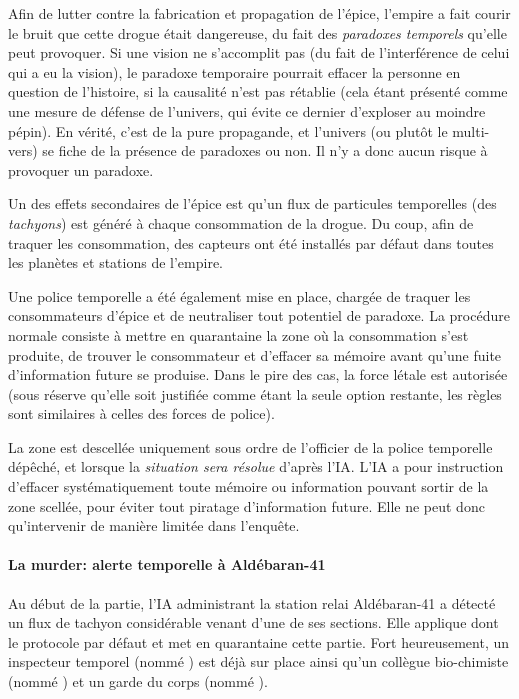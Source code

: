 {	\par Afin de lutter contre la fabrication et propagation de l'épice, l'empire a fait courir le bruit que cette drogue était dangereuse, du fait des \emph{paradoxes temporels} qu'elle peut provoquer. Si une vision ne s'accomplit pas (du fait de l'interférence de celui qui a eu la vision), le paradoxe temporaire pourrait effacer la personne en question de l'histoire, si la causalité n'est pas rétablie (cela étant présenté comme une mesure de défense de l'univers, qui évite ce dernier d'exploser au moindre pépin). En vérité, c'est de la pure propagande, et l'univers (ou plutôt le multi-vers) se fiche de la présence de paradoxes ou non. Il n'y a donc aucun risque à provoquer un paradoxe.
	
	\par Un des effets secondaires de l'épice est qu'un flux de particules temporelles (des \emph{tachyons}) est généré à chaque consommation de la drogue. Du coup, afin de traquer les consommation, des capteurs ont été installés par défaut dans toutes les planètes et stations de l'empire.
	
	\par Une police temporelle a été également mise en place, chargée de traquer les consommateurs d'épice et de neutraliser tout potentiel de paradoxe. La procédure normale consiste à mettre en quarantaine la zone où la consommation s'est produite, de trouver le consommateur et d'effacer sa mémoire avant qu'une fuite d'information future se produise. Dans le pire des cas, la force létale est autorisée (sous réserve qu'elle soit justifiée comme étant la seule option restante, les règles sont similaires à celles des forces de police).
	
	\par La zone est descellée uniquement sous ordre de l'officier de la police temporelle dépêché, et lorsque la \emph{situation sera résolue} d'après l'IA. L'IA a pour instruction d'effacer systématiquement toute mémoire ou information pouvant sortir de la zone scellée, pour éviter tout piratage d'information future. Elle ne peut donc qu'intervenir de manière limitée dans l'enquête.
	
	
	\paragraph{La murder: alerte temporelle à Aldébaran-41} Au début de la partie, l'IA administrant la station relai Aldébaran-41 a détecté un flux de tachyon considérable venant d'une de ses sections. Elle applique dont le protocole par défaut et met en quarantaine cette partie. Fort heureusement, un inspecteur temporel (nommé \emph{\nmPlayerVII}) est déjà sur place ainsi qu'un collègue bio-chimiste (nommé \emph{\nmPlayerXII}) et un garde du corps (nommé \emph{\nmPlayerVIII}).
	
}
